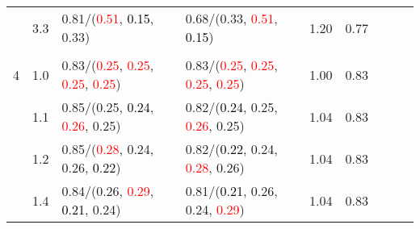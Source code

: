\documentclass[10pt,a4paper]{report}
\begin{document}
\begin{table}[!htbp]
\begin{center}
{\begin{tabular}{ccllccccc}
				  & 3.3                               & 0.81/(\textcolor{red}{0.51}, \textcolor{black}{0.15}, 0.33)                                                                                                                                   & 0.68/(0.33, \textcolor{red}{0.51}, \textcolor{black}{0.15})                                                                                                                                   & 1.20             & 0.77                     \\
				  &                                   &                                                                                                                                                                                               &                                                                                                                                                                                               &                                             \\
				4 & 1.0                               & 0.83/(\textcolor{red}{0.25}, \textcolor{red}{0.25}, \textcolor{red}{0.25}, \textcolor{red}{0.25})                                                                                             & 0.83/(\textcolor{red}{0.25}, \textcolor{red}{0.25}, \textcolor{red}{0.25}, \textcolor{red}{0.25})                                                                                             & 1.00             & 0.83                     \\
				  & 1.1                               & 0.85/(0.25, \textcolor{black}{0.24}, \textcolor{red}{0.26}, 0.25)                                                                                                                             & 0.82/(\textcolor{black}{0.24}, 0.25, \textcolor{red}{0.26}, 0.25)                                                                                                                             & 1.04             & 0.83                     \\
				  & 1.2                               & 0.85/(\textcolor{red}{0.28}, 0.24, 0.26, \textcolor{black}{0.22})                                                                                                                             & 0.82/(\textcolor{black}{0.22}, 0.24, \textcolor{red}{0.28}, 0.26)                                                                                                                             & 1.04             & 0.83                     \\
				  & 1.4                               & 0.84/(0.26, \textcolor{red}{0.29}, \textcolor{black}{0.21}, 0.24)                                                                                                                             & 0.81/(\textcolor{black}{0.21}, 0.26, 0.24, \textcolor{red}{0.29})                                                                                                                             & 1.04             & 0.83                     \\

\end{tabular}}
\end{center}
\end{table}
\end{document}
